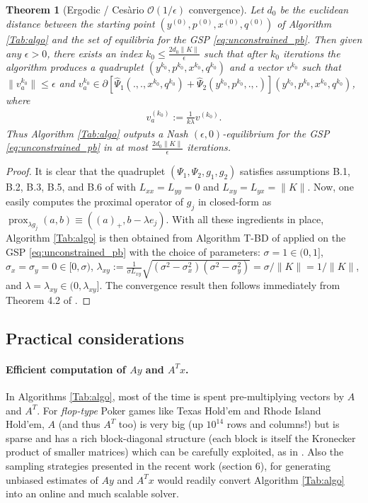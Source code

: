 \documentclass{article}
\DeclareMathOperator{\prox}{prox}
\newtheorem{theorem}{Theorem}
\begin{document}
\begin{theorem}[Ergodic / Ces\`ario $\mathcal{O}(1/\epsilon)$ convergence]
Let $d_0$ be the euclidean distance between the starting point
$(y^{(0)},p^{(0)},x^{(0)},q^{(0)})$ of Algorithm \ref{Tab:algo} and the
set of equilibria for the GSP \eqref{eq:unconstrained_pb}.
Then given any $\epsilon > 0$, there exists an index
$k_0 \le \frac{2d_0\|K\|}{\epsilon}$ such that after $k_0$ iterations
the algorithm produces a quadruplet
$(y^{k_0},p^{k_0},x^{k_0},q^{k_0})$ and a vector $v^{k_0}$ such that
$\|v_a^{k_0}\| \le \epsilon$ and $v_a^{k_0} \in
\partial[\hat{\Psi}_1(., ., x^{k_0}, q^{k_0}) +
  \hat{\Psi}_2(y^{k_0}, p^{k_0}, ., .)](y^{k_0},p^{k_0},x^{k_0},q^{k_0})$,
where
\begin{eqnarray}
\label{eq:v_a}
v_a^{(k_0)} := \frac{1}{k\lambda}v^{(k_0)}.
\end{eqnarray}
Thus Algorithm \ref{Tab:algo} outputs a Nash
$(\epsilon,0)$-equilibrium for the GSP \eqref{eq:unconstrained_pb}
in at most $\frac{2d_0\|K\|}{\epsilon}$ iterations.
\end{theorem}

\begin{proof}
It is clear that the quadruplet $(\Psi_1, \Psi_2, g_1, g_2)$
satisfies assumptions B.1, B.2, B.3, B.5, and B.6 of
\cite{he2013accelerating} with $L_{xx} = L_{yy} = 0$ and $L_{xy} =
L_{yx} = \|K\|$. Now, one easily computes the proximal operator of
$g_j$ in closed-form as $\prox_{\lambda g_j}(a, b) \equiv ((a)_+,
b - \lambda e_j)$. With all these ingredients in place, Algorithm
\ref{Tab:algo} is then obtained from Algorithm
  T-BD of \cite{he2013accelerating} applied on the GSP
\eqref{eq:unconstrained_pb} with the choice of parameters: $\sigma = 1
\in (0, 1]$, $\sigma_x = \sigma_y = 0 \in [0, \sigma)$,
    $\lambda_{xy} := \frac{1}{\sigma L_{xy}}\sqrt{(\sigma^2 -
        \sigma_x^2)(\sigma^2 - \sigma_y^2)} = \sigma / \|K\| =
      1/\|K\|$, and $\lambda = \lambda_{xy} \in (0,
      \lambda_{xy}]$. The convergence result then follows immediately
  from Theorem 4.2 of \cite{he2013accelerating}.
\end{proof}

\subsection{Practical considerations}
\paragraph{Efficient computation of $Ay$ and $A^Tx$.}
In Algorithms \ref{Tab:algo}, most of the time is spent
pre-multiplying vectors by $A$ and $A^T$. For \textit{flop-type} Poker
games like Texas Hold'em and  Rhode Island Hold'em,
$A$ (and thus $A^T$ too)  is very big (up $10^{14}$ rows and columns!)
but is sparse and has a rich block-diagonal structure (each block is
itself the Kronecker product of smaller matrices) which can be
carefully exploited, as in \cite{hoda2010smoothing}. Also the sampling
strategies presented in the recent work \cite{kroer2015} (section 6),
for generating unbiased estimates of $Ay$ and $A^Tx$ would readily
convert Algorithm \ref{Tab:algo} into an online and much scalable
solver.
\end{document}

